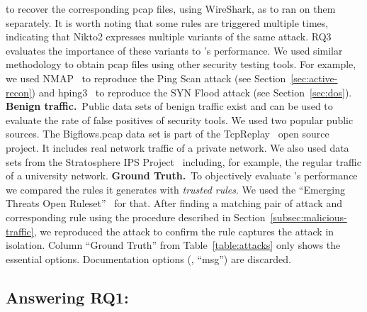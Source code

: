 \documentclass[conference]{IEEEtran}
\begin{document}
to recover the corresponding pcap files, using WireShark, as to ran
\tname{} on them separately. It is worth noting that some rules are
triggered multiple times, indicating that Nikto2 expresses multiple
variants of the same attack. RQ3 evaluates the importance of these
variants to \tname{}'s performance. We used similar methodology to
obtain pcap files using other security testing tools. For example, we
used NMAP~\cite{netmap} to reproduce the Ping Scan attack (see
Section~\ref{sec:active-recon}) and hping3~\cite{hping3} to reproduce
the SYN Flood attack (see Section~\ref{sec:dos}).
\noindent\textbf{Benign traffic.}~Public data sets of benign traffic
exist and can be used to evaluate the rate of false positives of
security tools. We used two popular public sources. The Bigflows.pcap
data set is part of the TcpReplay~\cite{tcpreplay} open source
project. It includes real network traffic of a private network. We
also used data sets from the Stratosphere IPS
Project~\cite{stratosphere-normal} including, for example, the regular
traffic of a university network.
\noindent\textbf{Ground Truth.}~To objectively evaluate \tname{}'s
performance we compared the rules it generates with \emph{trusted
  rules}. We used the ``Emerging Threats Open
Ruleset''~\cite{emerging-threats-open} for that. After finding a
matching pair of attack and corresponding rule using the procedure
described in Section~\ref{subsec:malicious-traffic}, we reproduced the
attack to confirm the rule captures the attack in isolation. Column
``Ground Truth'' from Table~\ref{table:attacks} only shows the
essential options. Documentation options (\eg{}, ``msg'') are
discarded.


\subsection{Answering RQ1: \textRQone}
\label{sec:answer-rqone}
\end{document}
